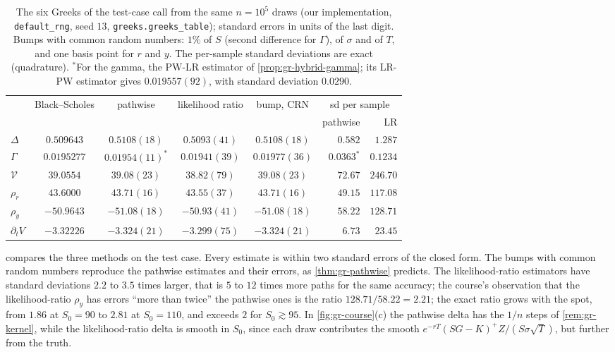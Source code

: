 \begin{table}[ht]
  \centering
  \small
  \begin{tabular}{@{}lccccrr@{}}
    \toprule
    & Black--Scholes & pathwise & likelihood ratio & bump, CRN & \multicolumn{2}{c}{sd per sample}\\
    & & & & & pathwise & LR \\
    \midrule
    $\Delta$ & $0.509643$ & $0.5108(18)$ & $0.5093(41)$ & $0.5108(18)$ & $0.582$ & $1.287$ \\
    $\Gamma$ & $0.0195277$ & $0.01954(11)^\ast$ & $0.01941(39)$ & $0.01977(36)$ & $0.0363^\ast$ & $0.1234$ \\
    $\mathcal V$ & $39.0554$ & $39.08(23)$ & $38.82(79)$ & $39.08(23)$ & $72.67$ & $246.70$ \\
    $\rho_r$ & $43.6000$ & $43.71(16)$ & $43.55(37)$ & $43.71(16)$ & $49.15$ & $117.08$ \\
    $\rho_y$ & $-50.9643$ & $-51.08(18)$ & $-50.93(41)$ & $-51.08(18)$ & $58.22$ & $128.71$ \\
    $\partial_tV$ & $-3.32226$ & $-3.324(21)$ & $-3.299(75)$ & $-3.324(21)$ & $6.73$ & $23.45$ \\
    \bottomrule
  \end{tabular}
  \caption{The six Greeks of the test-case call from the same $n=10^5$ draws (our
    implementation, \texttt{default\_rng}, seed $13$, \texttt{greeks.greeks\_table}); standard
    errors in units of the last digit. Bumps with common random numbers: $1\%$ of $S$ (second
    difference for $\Gamma$), of $\sigma$ and of $T$, and one basis point for $r$ and $y$.
    The per-sample standard deviations are exact (quadrature). $^\ast$For the gamma, the
    PW-LR estimator of \cref{prop:gr-hybrid-gamma}; its LR-PW estimator gives $0.019557(92)$,
    with standard deviation $0.0290$.}
  \label{tab:gr-lab}
\end{table}

 compares the three methods on the test case. Every estimate is within two
standard errors of the closed form. The bumps with common random numbers reproduce the pathwise
estimates and their errors, as \cref{thm:gr-pathwise} predicts. The likelihood-ratio
estimators have standard deviations $2.2$ to $3.5$ times larger, that is $5$ to $12$ times more
paths for the same accuracy; the course's observation that the likelihood-ratio $\rho_y$ has
errors ``more than twice'' the pathwise ones is the ratio $128.71/58.22=2.21$; the exact ratio
grows with the spot, from $1.86$ at $S_0=90$ to $2.81$ at $S_0=110$, and exceeds $2$ for
$S_0\gtrsim95$. In
\cref{fig:gr-course}(c) the pathwise delta has the $1/n$ steps of \cref{rem:gr-kernel}, while
the likelihood-ratio delta is smooth in $S_0$, since each draw contributes the smooth
$e^{-rT}(SG-K)^+Z/(S\sigma\sqrt T)$, but further from the truth.

